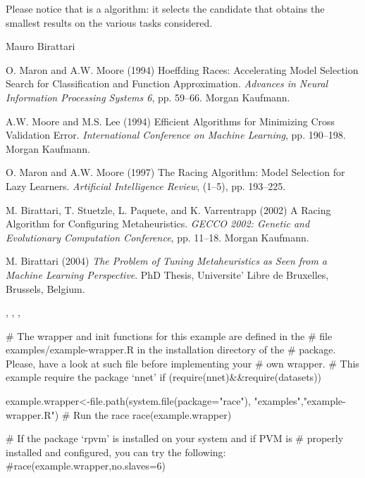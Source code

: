 \begin{Note}\relax
Please notice that  is a  algorithm:
it selects the candidate that obtains the smallest results on
the various tasks considered.
\end{Note}
\begin{Author}\relax
Mauro Birattari
\end{Author}
\begin{References}\relax
O. Maron and A.W. Moore (1994) Hoeffding Races: Accelerating Model
Selection Search for Classification and Function Approximation.
\emph{Advances in Neural Information Processing Systems 6},
pp. 59--66. Morgan Kaufmann.

A.W. Moore and M.S. Lee (1994) Efficient Algorithms for Minimizing
Cross Validation Error. \emph{International Conference on Machine Learning},
pp. 190--198. Morgan Kaufmann.

O. Maron and A.W. Moore (1997) The Racing Algorithm: Model Selection
for Lazy Learners. \emph{Artificial Intelligence Review},
(1--5), pp. 193--225.

M. Birattari, T. Stuetzle, L. Paquete, and K. Varrentrapp
(2002) A Racing Algorithm for Configuring Metaheuristics. 
\emph{GECCO 2002: Genetic and Evolutionary Computation Conference},
pp. 11--18. Morgan Kaufmann.

M. Birattari (2004) \emph{The Problem of Tuning Metaheuristics 
as Seen from a Machine Learning Perspective}. PhD Thesis, 
Universite' Libre de Bruxelles, Brussels, Belgium.
\end{References}
\begin{SeeAlso}\relax
{}, ,
, 
\end{SeeAlso}
\begin{Examples}
\begin{ExampleCode}
# The wrapper and init functions for this example are defined in the
# file examples/example-wrapper.R in the installation directory of the
# package.  Please, have a look at such file before implementing your
# own wrapper.
# This example require the package `nnet'
if (require(nnet)&&require(datasets)){
  example.wrapper<-file.path(system.file(package="race"),
                           "examples","example-wrapper.R")
  # Run the race
  race(example.wrapper)

  # If the package `rpvm' is installed on your system and if PVM is
  # properly installed and configured, you can try the following:
  #race(example.wrapper,no.slaves=6)
}
\end{ExampleCode}
\end{Examples}

